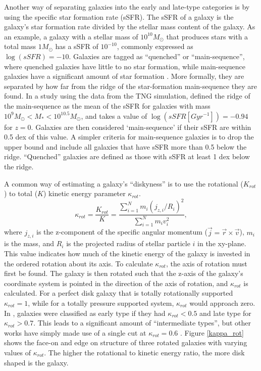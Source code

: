 Another way of separating galaxies into the early and late-type categories is by using the specific star formation rate (sSFR). The sSFR of a galaxy is the galaxy's star formation rate divided by the stellar mass content of the galaxy. As an example, a galaxy with a stellar mass of $10^{10} M_\odot$ that produces stars with a total mass $1 M_\odot$ has a sSFR of $10^{-10}$, commonly expressed as $\log(sSFR) = -10$. Galaxies are tagged as ``quenched'' or ``main-sequence'', where quenched galaxies have little to no star formation, while main-sequence galaxies have a significant amount of star formation \parencite{Noeske2007}. More formally, they are separated by how far from the ridge of the star-formation main-sequence they are found. In a study using the data from the TNG simulation, \textcite{Genel2017} defined the ridge of the main-sequence as the mean of the sSFR for galaxies with mass $10^{9} M_{\odot} < M_* < 10^{10.5} M_{\odot}$, and takes a value of $\log (sSFR[Gyr^{-1}]) = -0.94$ for $z=0$. Galaxies are then considered `main-sequence' if their sSFR are within 0.5 dex of this value. A simpler criteria for main-sequence galaxies is to drop the upper bound and include all galaxies that have sSFR more than 0.5 below the ridge. ``Quenched'' galaxies are defined as those with sSFR at least 1 dex below the ridge. 

A common way of estimating a galaxy's ``diskyness'' is to use the rotational ($K_{rot}$) to total ($K$) kinetic energy parameter $\kappa_{rot}$. 
\begin{equation}
    \kappa_{rot} = \frac{K_{rot}}{K} = \frac{\sum_{i=1}^{N} m_i (j_{z, i}/R_i)^2}{\sum_{i=1}^{N} m_i v_i^2},
\end{equation}
where $j_{z, i}$ is the z-component of the specific angular momentum ($\vec{j} = \vec{r} \times \vec{v}$), $m_i$ is the mass, and $R_i$ is the projected radius of stellar particle $i$ in the xy-plane. 
This value indicates how much of the kinetic energy of the galaxy is invested in the ordered rotation about its axis. To calculate $\kappa_{rot}$, the axis of rotation must first be found. The galaxy is then rotated such that the z-axis of the galaxy's coordinate system is pointed in the direction of the axis of rotation, and $\kappa_{rot}$ is calculated.
For a perfect disk galaxy that is totally rotationally supported $\kappa_{rot} = 1$, while for a totally pressure supported system, $\kappa_{rot}$ would approach zero. In \textcite{Sales2012}, galaxies were classified as early type if they had $\kappa_{rot} < 0.5$ and late type for $\kappa_{rot} > 0.7$. This leads to a significant amount of ``intermediate types'', but other works have simply made use of a single cut at $\kappa_{rot} = 0.6$ \parencite{Ferrero2020}. Figure \ref{kappa_rot} shows the face-on and edge on structure of three rotated galaxies with varying values of $\kappa_{rot}$. The higher the rotational to kinetic energy ratio, the more disk shaped is the galaxy.


